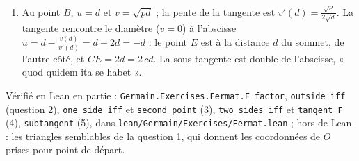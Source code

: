 \documentclass[11pt,a4paper]{article}
\begin{document}
\begin{solution}
\begin{enumerate}
  $0$ : il faut donc $a^2 - 2da \le 0$, soit $a \le 2d$. Avec la question
  précédente, $a = 2d$, et alors $F(e) = de^2 > 0$ pour tout $e \neq 0$ : tout
  point de la droite autre que $B$ est hors de la parabole, qui est touchée sans
  être coupée. Pris des deux côtés, l'énoncé « $O$ est hors de la parabole »
  dit que $F$, nulle en $0$, a en $0$ un minimum ; le quotient $F(e)/e$ est
  alors positif pour $e > 0$ et négatif pour $e < 0$, et sa limite $F'(0)$ est
  à la fois positive ou nulle et négative ou nulle : $F'(0) = 0$. C'est exactement le calcul du
  feuillet, qui est donc une condition nécessaire démontrée, et la vérification
  $F(e) = de^2$ en donne la réciproque. D'un seul côté, l'inégalité n'impose que
  $F'(0) \ge 0$, et l'égalité que le feuillet en tire n'est pas justifiée par
  elle.
\item Au point $B$, $u = d$ et $v = \sqrt{pd}$ ; la pente de la tangente est
  $v'(d) = \frac{\sqrt p}{2\sqrt d}$. La tangente rencontre le diamètre
  ($v = 0$) à l'abscisse $u = d - \frac{v(d)}{v'(d)} = d - 2d = -d$ : le point
  $E$ est à la distance $d$ du sommet, de l'autre côté, et $CE = 2d = 2\,cd$. La
  sous-tangente est double de l'abscisse, « quod quidem ita se habet ».
\end{enumerate}

Vérifié en Lean en partie : \texttt{Germain.Exercises.Fermat.F\_factor},
\texttt{outside\_iff} (question 2), \texttt{one\_side\_iff} et \texttt{second\_point} (3),
\texttt{two\_sides\_iff} et \texttt{tangent\_F} (4), \texttt{subtangent} (5), dans
\texttt{lean/Germain/Exercises/Fermat.lean} ; hors de Lean : les triangles semblables de la question 1, qui donnent les
coordonnées de $O$ prises pour point de départ.
\end{solution}
\end{document}
